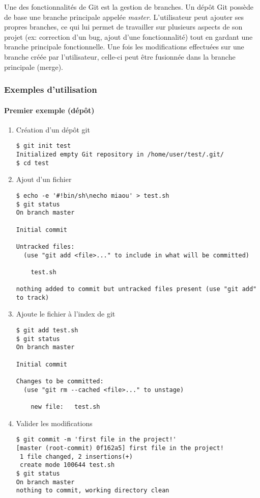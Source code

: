Une des fonctionnalités de Git est la gestion de branches. Un dépôt Git possède de base une branche principale appelée \emph{master}. L'utilisateur peut ajouter ses propres branches, ce qui lui permet de travailler sur plusieurs aspects de son projet (ex: correction d'un bug, ajout d'une fonctionnalité) tout en gardant une branche principale fonctionnelle. Une fois les modifications effectuées sur une branche créée par l'utilisateur, celle-ci peut être fusionnée dans la branche principale (merge).

\subsubsection*{Exemples d'utilisation}
\paragraph{Premier exemple (dépôt)}
\begin{enumerate}
\item Création d'un dépôt git
\begin{lstlisting}
$ git init test
Initialized empty Git repository in /home/user/test/.git/
$ cd test
\end{lstlisting}
\item Ajout d'un fichier
\begin{lstlisting}
$ echo -e '#!bin/sh\necho miaou' > test.sh
$ git status
On branch master

Initial commit

Untracked files:
  (use "git add <file>..." to include in what will be committed)

	test.sh

nothing added to commit but untracked files present (use "git add" to track)
\end{lstlisting}
\item Ajoute le fichier à l'index de git
\begin{lstlisting}
$ git add test.sh
$ git status
On branch master

Initial commit

Changes to be committed:
  (use "git rm --cached <file>..." to unstage)

	new file:   test.sh
\end{lstlisting}
\item Valider les modifications
\begin{lstlisting}
$ git commit -m 'first file in the project!'
[master (root-commit) 0f162a5] first file in the project!
 1 file changed, 2 insertions(+)
 create mode 100644 test.sh
$ git status
On branch master
nothing to commit, working directory clean
\end{lstlisting}
\end{enumerate}

